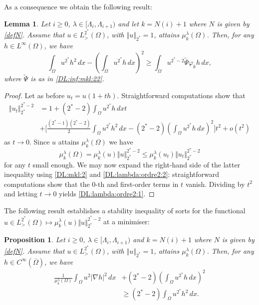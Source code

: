 \documentclass[10pt]{amsart}
\numberwithin{equation}{section}
\newcommand{\vp}{\varphi}
\newcommand{\Om}{\Omega}
\newcommand{\mkl}{\mu_{k}^{\lambda}}
\theoremstyle{plain}
\newtheorem{prop}{Proposition}[section]%
\newtheorem{lemme}{Lemma}[section]%
\theoremstyle{remark}
\begin{document}
As a consequence we obtain the following result: 

\begin{lemme}
Let $i \ge 0$, $\lambda \in [\Lambda_i, \Lambda_{i+1})$ and let $k = N(i)+1$ where $N$ is given by \eqref{defN}. Assume that $u \in L^{2^*}_{>}(\Om)$, with $\Vert u \Vert_{2^*} = 1$, attains $\mkl(\Om)$. Then, for any $h \in L^\infty(\Om)$, we have 
\begin{equation} \label{DL:lambda:ordre2:1}
\int_{\Om} u^{2^*} h^2 \, dx - \left( \int_{\Om} u^{2^*} h \, dx \right)^2 \ge \int_{\Om} u^{2^*-2} \tilde{\Psi} \vp_k h \, dx, 
\end{equation}
where $\tilde{\Psi}$ is as in \eqref{DL:inf:mkl:22}.
\end{lemme}

\begin{proof}
Let as before $u_t = u(1+th)$. Straightforward computations show that 
\begin{equation} \label{DL:lambda:ordre2:2}
 \begin{aligned}
\Vert u_t \Vert_{2^*}^{2^*-2} & = 1 + (2^*-2)  \int_{\Om} u^{2^*}h \, dx t \\
& + \Bigg[ \frac{(2^*-1)(2^*-2)}{2} \int_{\Om} u^{2^*} h^2 \, dx - (2^*-2) \left(\int_{\Om}u^{2^*} h \, dx \right)^2 \Bigg] t^2 + o(t^2) 
\end{aligned} 
\end{equation}
as $t \to 0$. Since $u$ attains $\mkl(\Om)$ we have 
$$ \mkl(\Om) = \mkl(u) \Vert u \Vert_{2^*}^{2^*-2} \le \mkl(u_t)\Vert u_t \Vert_{2^*}^{2^*-2}  $$
for any $t$ small enough. We may now expand the right-hand side of the latter inequality using \eqref{DL:mkl:2} and \eqref{DL:lambda:ordre2:2}: straightforward computations show that the $0$-th and first-order terms in $t$ vanish. Dividing by $t^2$ and letting $t \to 0$ yields \eqref{DL:lambda:ordre2:1}. 
\end{proof}


The following result establishes a stability inequality of sorts for the functional $u \in L^{2^*}_{>}(\Om) \mapsto \mkl(u) \Vert u \Vert_{2^*}^{2^*-2}$ at a minimiser:

\begin{prop} \label{prop:DL:lambda:ordre:2}
Let $i \ge 0$,  $\lambda \in [\Lambda_i, \Lambda_{i+1})$ and $k = N(i)+1$ where $N$ is given by \eqref{defN}. Assume that $u \in L^{2^*}_{>}(\Om)$, with $\Vert u \Vert_{2^*} = 1$, attains $\mkl(\Om)$. Then, for any $h \in C^\infty(\overline{\Om})$, we have 
\begin{equation} \label{DL:lambda:ordre2:3}
\begin{aligned}
\frac{1}{\mkl(\Om)} \int_{\Om} u^2 |\nabla h |^2 \, dx & + (2^*-2) \left( \int_{\Om} u^{2^*} h \, dx \right)^2 \\ 
& \ge (2^*-2) \int_{\Om} u^{2^*} h^2 \, dx.
\end{aligned} 
\end{equation}
\end{prop}
\end{document}
